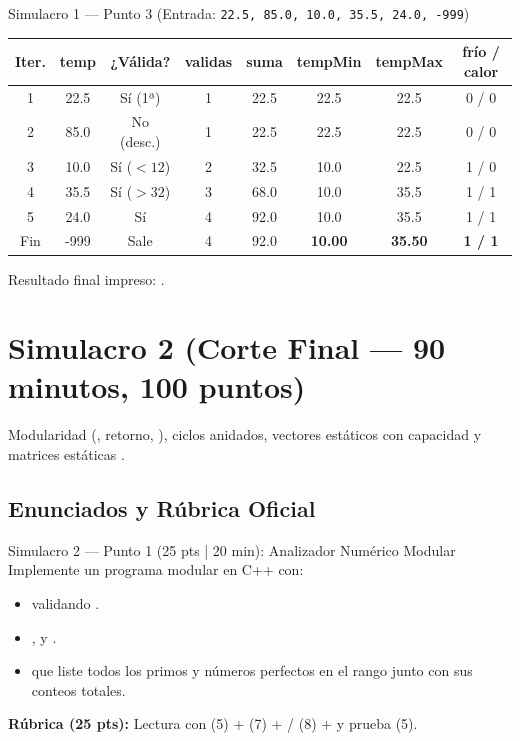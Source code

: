 \documentclass[11pt,letterpaper]{article}
\begin{document}
\begin{pruebaescritorio}{Simulacro 1 — Punto 3 (Entrada: \texttt{22.5, 85.0, 10.0, 35.5, 24.0, -999})}
\begin{center}
\small
\begin{tabular}{cccccccc}
\toprule
\textbf{Iter.} & \textbf{temp} & \textbf{¿Válida?} & \textbf{validas} & \textbf{suma} & \textbf{tempMin} & \textbf{tempMax} & \textbf{frío / calor} \\
\midrule
1 & 22.5 & Sí (1ª) & 1 & 22.5 & 22.5 & 22.5 & 0 / 0 \\
2 & 85.0 & No (desc.) & 1 & 22.5 & 22.5 & 22.5 & 0 / 0 \\
3 & 10.0 & Sí ($<12$) & 2 & 32.5 & 10.0 & 22.5 & 1 / 0 \\
4 & 35.5 & Sí ($>32$) & 3 & 68.0 & 10.0 & 35.5 & 1 / 1 \\
5 & 24.0 & Sí & 4 & 92.0 & 10.0 & 35.5 & 1 / 1 \\
Fin & -999 & Sale & 4 & 92.0 & \textbf{10.00} & \textbf{35.50} & \textbf{1 / 1} \\
\bottomrule
\end{tabular}
\end{center}
Resultado final impreso: .
\end{pruebaescritorio}

\clearpage
\section{Simulacro 2 (Corte Final — 90 minutos, 100 puntos)}

 Modularidad (, retorno, \codigo{\&}), ciclos anidados, vectores estáticos con capacidad  y matrices estáticas \codigo{[][MAX\_C]}.

\subsection{Enunciados y Rúbrica Oficial}

\begin{ejercicio}{Simulacro 2 — Punto 1 (25 pts | 20 min): Analizador Numérico Modular}
Implemente un programa modular en C++ con:
\begin{itemize}
  \item {} validando .
  \item {},  y .
  \item {} que liste todos los primos y números perfectos en el rango junto con sus conteos totales.
\end{itemize}
\textbf{Rúbrica (25 pts):} Lectura con \codigo{\&} (5) +  (7) + / (8) +  y prueba (5).
\end{ejercicio}
\end{document}
